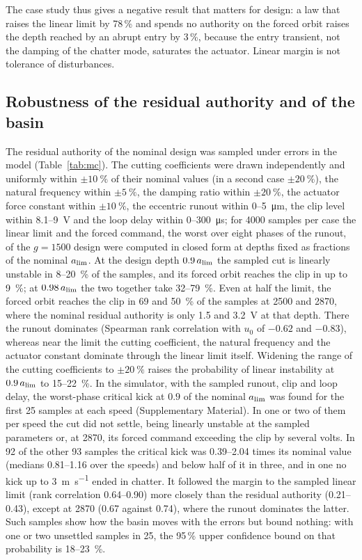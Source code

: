 The case study thus gives a negative result that matters for design: a law that raises the linear limit by 78\,\% and spends no authority on the forced orbit raises the depth reached by an abrupt entry by 3\,\%, because the entry transient, not the damping of the chatter mode, saturates the actuator. Linear margin is not tolerance of disturbances.

\subsection{Robustness of the residual authority and of the basin}\label{sec:delayed-robust}

The residual authority of the nominal design was sampled under errors in the model (Table~\ref{tab:mc}). The cutting coefficients were drawn independently and uniformly within $\pm\SI{10}{\percent}$ of their nominal values (in a second case $\pm\SI{20}{\percent}$), the natural frequency within $\pm\SI{5}{\percent}$, the damping ratio within $\pm\SI{20}{\percent}$, the actuator force constant within $\pm\SI{10}{\percent}$, the eccentric runout within 0--\SI{5}{\micro\metre}, the clip level within 8.1--\SI{9}{\volt} and the loop delay within 0--\SI{300}{\micro\second}; for 4000 samples per case the linear limit and the forced command, the worst over eight phases of the runout, of the $g=1500$ design were computed in closed form at depths fixed as fractions of the nominal $a_{\lim}$. At the design depth $0.9\,a_{\lim}$ the sampled cut is linearly unstable in 8--\SI{20}{\percent} of the samples, and its forced orbit reaches the clip in up to \SI{9}{\percent}; at $0.98\,a_{\lim}$ the two together take 32--\SI{79}{\percent}. Even at half the limit, the forced orbit reaches the clip in 69 and \SI{50}{\percent} of the samples at 2500 and \SI{2870}{\rpm}, where the nominal residual authority is only 1.5 and \SI{3.2}{\volt} at that depth. There the runout dominates (Spearman rank correlation with $u_0$ of $-0.62$ and $-0.83$), whereas near the limit the cutting coefficient, the natural frequency and the actuator constant dominate through the linear limit itself. Widening the range of the cutting coefficients to $\pm\SI{20}{\percent}$ raises the probability of linear instability at $0.9\,a_{\lim}$ to 15--\SI{22}{\percent}. In the simulator, with the sampled runout, clip and loop delay, the worst-phase critical kick at $0.9$ of the nominal $a_{\lim}$ was found for the first 25 samples at each speed (Supplementary Material). In one or two of them per speed the cut did not settle, being linearly unstable at the sampled parameters or, at \SI{2870}{\rpm}, its forced command exceeding the clip by several volts. In 92 of the other 93 samples the critical kick was 0.39--2.04 times its nominal value (medians 0.81--1.16 over the speeds) and below half of it in three, and in one no kick up to \SI{3}{\metre\per\second} ended in chatter. It followed the margin to the sampled linear limit (rank correlation 0.64--0.90) more closely than the residual authority (0.21--0.43), except at \SI{2870}{\rpm} (0.67 against 0.74), where the runout dominates the latter. Such samples show how the basin moves with the errors but bound nothing: with one or two unsettled samples in 25, the 95\,\% upper confidence bound on that probability is 18--\SI{23}{\percent}.
